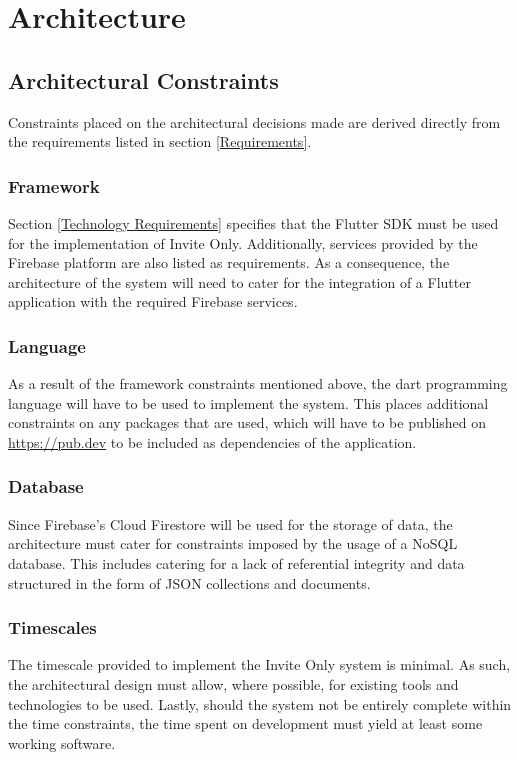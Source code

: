 \section{Architecture} \label{Architecture}

\subsection{Architectural Constraints}

Constraints placed on the architectural decisions made are derived directly from the requirements listed in section \ref{Requirements}.

\subsubsection{Framework}
Section \ref{Technology Requirements} specifies that the Flutter SDK must be used for the implementation of Invite Only. Additionally, services provided by the Firebase platform are also listed as requirements. As a consequence, the architecture of the system will need to cater for the integration of a Flutter application with the required Firebase services.

\subsubsection{Language}
As a result of the framework constraints mentioned above, the dart programming language will have to be used to implement the system. This places additional constraints on any packages that are used, which will have to be published on \url{https://pub.dev} to be included as dependencies of the application.

\subsubsection{Database}
Since Firebase's Cloud Firestore will be used for the storage of data, the architecture must cater for constraints imposed by the usage of a NoSQL database. This includes catering for a lack of referential integrity and data structured in the form of JSON collections and documents.

\subsubsection{Timescales}
The timescale provided to implement the Invite Only system is minimal. As such, the architectural design must allow, where possible, for existing tools and technologies to be used. Lastly, should the system not be entirely complete within the time constraints, the time spent on development must yield at least some working software.

